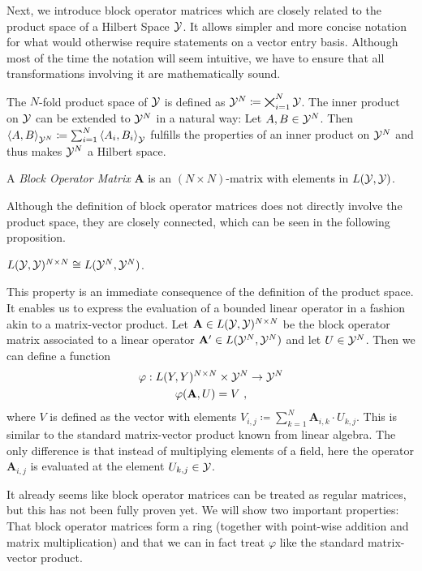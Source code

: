 Next, we introduce block operator matrices which are closely related to the product space of a Hilbert Space $\mathcal{Y}$.
It allows simpler and more concise notation for what would otherwise require statements on a vector entry basis.
Although most of the time the notation will seem intuitive, we have to ensure that all transformations involving it are mathematically sound.

The $N$-fold product space of $\mathcal{Y}$ is defined as $\mathcal{Y}^N \coloneqq \bigtimes_{i=1}^N \mathcal{Y}$.
The inner product on $\mathcal{Y}$ can be extended to $\mathcal{Y}^N$ in a natural way:
Let $A, B \in \mathcal{Y}^N$.
Then $\left < A, B \right >_{\mathcal{Y}^N} \coloneqq \sum_{i=1}^{N} \left <A_i, B_i \right >_{\mathcal{Y}}$ fulfills the properties of an inner product on $\mathcal{Y}^N$ and thus makes $\mathcal{Y}^N$ a Hilbert space.

\begin{definition}
	A \emph{Block Operator Matrix} $\mathbf{A}$ is an $(N \times N)$-matrix with elements in $L(\mathcal{Y}, \mathcal{Y})$.
\end{definition}
Although the definition of block operator matrices does not directly involve the product space, they are closely connected, which can be seen in the following proposition.
\begin{proposition}
  $L(\mathcal{Y}, \mathcal{Y})^{N \times N} \cong L(\mathcal{Y}^N, \mathcal{Y}^N)$.
\end{proposition}
This property is an immediate consequence of the definition of the product space.
It enables us to express the evaluation of a bounded linear operator in a fashion akin to a matrix-vector product.
Let $\mathbf{A} \in L(\mathcal{Y}, \mathcal{Y})^{N\times N}$ be the block operator matrix associated to a linear operator $\mathbf{A}^\prime \in L(\mathcal{Y}^N, \mathcal{Y}^N)$ and let $U \in \mathcal{Y}^N$.
Then we can define a function
\begin{gather}
	\varphi: L(Y, Y)^{N\times N} \times \mathcal{Y}^N \rightarrow \mathcal{Y}^N \\
	\varphi(\mathbf{A}, U) = V \ ,
\end{gather}
where $V$ is defined as the vector with elements $V_{i, j} \coloneqq \sum_{k = 1}^N \mathbf{A}_{i,k} \cdot U_{k, j}$.
This is similar to the standard matrix-vector product known from linear algebra.
The only difference is that instead of multiplying elements of a field, here the operator $\mathbf{A}_{i, j}$ is evaluated at the element $U_{k, j} \in \mathcal{Y}$.

It already seems like block operator matrices can be treated as regular matrices, but this has not been fully proven yet.
We will show two important properties: That block operator matrices  form a ring (together with point-wise addition and matrix multiplication) and that we can in fact treat $\varphi$ like the standard matrix-vector product.


